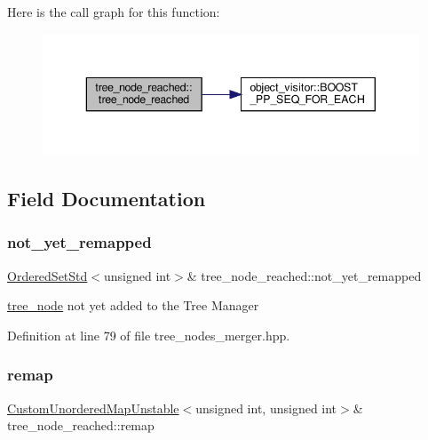 Here is the call graph for this function\+:
\nopagebreak
\begin{figure}[H]
\begin{center}
\leavevmode
\includegraphics[width=343pt]{dc/d60/structtree__node__reached_a70e5d64f5a1e008ac4c12e7193e54a66_cgraph}
\end{center}
\end{figure}


\subsection{Field Documentation}
\mbox{\label{structtree__node__reached_a9fc6bd45350ed85c68cb76ade1b49977}} 
\subsubsection{\texorpdfstring{not\+\_\+yet\+\_\+remapped}{not\_yet\_remapped}}
{\footnotesize\ttfamily \hyperlink{custom__set_8hpp_a0e09160c8f8e7883e68096bbb174762e}{Ordered\+Set\+Std}$<$unsigned int$>$\& tree\+\_\+node\+\_\+reached\+::not\+\_\+yet\+\_\+remapped\hspace{0.3cm}{\ttfamily [private]}}



\hyperlink{classtree__node}{tree\+\_\+node} not yet added to the Tree Manager 



Definition at line 79 of file tree\+\_\+nodes\+\_\+merger.\+hpp.

\mbox{\label{structtree__node__reached_a105044038b38b5b45c904ae970af6660}} 
\subsubsection{\texorpdfstring{remap}{remap}}
{\footnotesize\ttfamily \hyperlink{custom__map_8hpp_a8cbaceffc09790a885ec7e9c17809c69}{Custom\+Unordered\+Map\+Unstable}$<$unsigned int, unsigned int$>$\& tree\+\_\+node\+\_\+reached\+::remap\hspace{0.3cm}{\ttfamily [private]}}




